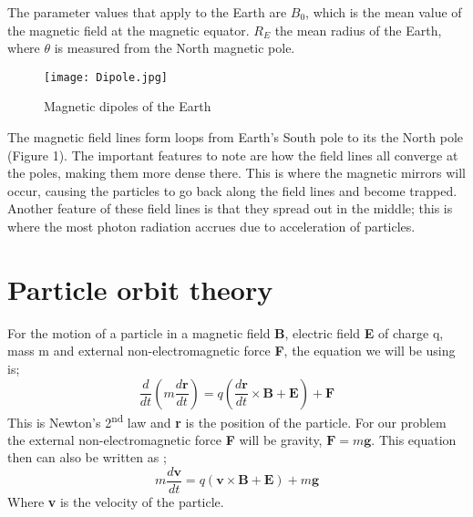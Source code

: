 \documentclass[14paper,11pt,hidelinks]{article}
\begin{document}
The parameter values that apply to the Earth are \begin{math}B_0\end{math}, which is the mean value of the magnetic field at the magnetic equator. \begin{math}R_E\end{math} the mean radius of the Earth, where \begin{math}\theta\end{math} is measured from the North magnetic pole.
\newline
\begin{figure}[!ht]
\centering
\texttt{[image: Dipole.jpg]} 
\caption{ Magnetic dipoles of the Earth}
\end{figure}
\newline
The magnetic field lines form loops from Earth's South pole to its the North pole (Figure 1). The important features to note are how the field lines all converge at the poles, making them more dense there. This is where the magnetic mirrors will occur, causing the particles to go back along the field lines and become trapped. Another feature of these field lines is that they spread out in the middle; this is where the most photon radiation accrues due to acceleration of particles.



\section{Particle orbit theory}
For the motion of a particle in a magnetic field \textbf{B}, electric field \textbf{E} of charge q, mass m and external non-electromagnetic force \textbf{F}, the equation we will be using is;
\begin{equation}
\frac{d}{dt}\left(m\frac{d\mathbf{r}}{dt}\right)=q\left(\frac{d\mathbf{r}}{dt}\times\mathbf{B}+\mathbf{E}\right)+\mathbf{F}
\end{equation}
This is Newton's 2\textsuperscript{nd} law and \textbf{r} is the position of the particle. For our problem the external non-electromagnetic force \textbf{F} will be gravity, \begin{math}\mathbf{F}=m\mathbf{g}\end{math}. This equation then can also be written as \citep{roederer_dynamics_2014};
\begin{equation}
m\frac{d\mathbf{v}}{dt}=q\left(\mathbf{v}\times\mathbf{B}+\mathbf{E}\right)+m\mathbf{g}
\end{equation}
Where \textbf{v} is the velocity of the particle.
\end{document}
